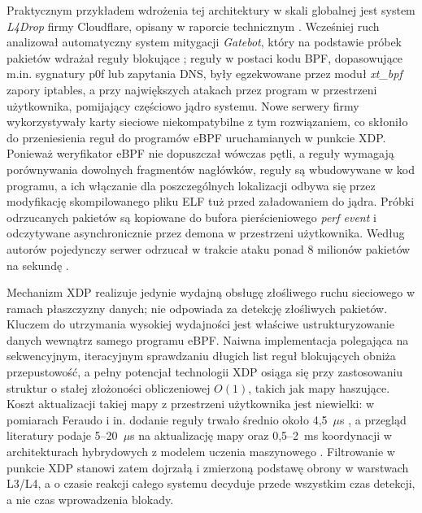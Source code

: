 \documentclass[a4paper,12pt]{article}
\begin{document}
Praktycznym przykładem wdrożenia tej architektury w skali globalnej jest system \textit{L4Drop} firmy Cloudflare, opisany w raporcie technicznym \cite{fabre2018l4drop}. Wcześniej ruch analizował automatyczny system mitygacji \textit{Gatebot}, który na podstawie próbek pakietów wdrażał reguły blokujące \cite{majkowski2017gatebot}; reguły w postaci kodu BPF, dopasowujące m.in. sygnatury p0f lub zapytania DNS, były egzekwowane przez moduł \textit{xt\_bpf} zapory iptables, a przy największych atakach przez program w przestrzeni użytkownika, pomijający częściowo jądro systemu. Nowe serwery firmy wykorzystywały karty sieciowe niekompatybilne z tym rozwiązaniem, co skłoniło do przeniesienia reguł do programów eBPF uruchamianych w punkcie XDP. Ponieważ weryfikator eBPF nie dopuszczał wówczas pętli, a reguły wymagają porównywania dowolnych fragmentów nagłówków, reguły są wbudowywane w kod programu, a ich włączanie dla poszczególnych lokalizacji odbywa się przez modyfikację skompilowanego pliku ELF tuż przed załadowaniem do jądra. Próbki odrzucanych pakietów są kopiowane do bufora pierścieniowego \textit{perf event} i odczytywane asynchronicznie przez demona w przestrzeni użytkownika. Według autorów pojedynczy serwer odrzucał w trakcie ataku ponad 8 milionów pakietów na sekundę \cite{fabre2018l4drop}.

Mechanizm XDP realizuje jedynie wydajną obsługę złośliwego ruchu sieciowego w ramach płaszczyzny danych; nie odpowiada za detekcję złośliwych pakietów. Kluczem do utrzymania wysokiej wydajności jest właściwe ustrukturyzowanie danych wewnątrz samego programu eBPF. Naiwna implementacja polegająca na sekwencyjnym, iteracyjnym sprawdzaniu długich list reguł blokujących obniża przepustowość, a pełny potencjał technologii XDP osiąga się przy zastosowaniu struktur o stałej złożoności obliczeniowej $O(1)$, takich jak mapy haszujące. Koszt aktualizacji takiej mapy z przestrzeni użytkownika jest niewielki: w pomiarach Feraudo i in. dodanie reguły trwało średnio około 4,5~$\mu$s \cite{feraudo2024mitigating}, a przegląd literatury podaje 5--20~$\mu$s na aktualizację mapy oraz 0,5--2~ms koordynacji w architekturach hybrydowych z modelem uczenia maszynowego \cite{kostopoulos2026ebpf}. Filtrowanie w punkcie XDP stanowi zatem dojrzałą i zmierzoną podstawę obrony w warstwach L3/L4, a o czasie reakcji całego systemu decyduje przede wszystkim czas detekcji, a nie czas wprowadzenia blokady.
\end{document}

